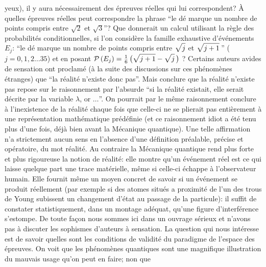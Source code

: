 yeux), il y aura n\'ecessairement des \'epreuves r\'eelles qui lui 
correspondent?  \`A  quelles \'epreuves r\'eelles peut correspondre la 
phrase ``le d\'e marque  un nombre de points compris entre $\sqrt{2}$  et 
$\sqrt{3}$''? Que  donnerait un calcul utilisant la r\`egle des 
probabilit\'es conditionnelles, si l'on consid\`ere la famille exhaustive 
d'\'ev\'enements $E_j$: ``le d\'e marque un nombre de points compris 
entre $\sqrt{\sdown{8.6} j}$ et $\sqrt{\sdown{8.6} j+1}\,$'' ($j=0,1,2 
\ldots  35$) et en posant ${\cal P}\, (E_j) = {1\over 
6}\,\big(\sqrt{\sdown{8.6} j+1} - \sqrt{\sdown{8.6} j}\,\big)$ ?  
\medskip 
Certains auteurs avides de sensation ont proclam\'e (\`a la suite des 
discussions sur ces ph\'enom\`enes \'etranges) que ``la r\'ealit\'e  
n'existe donc pas''. Mais conclure que la r\'ealit\'e n'existe pas repose  
sur le raisonnement par l'absurde ``si la r\'ealit\'e existait, elle serait  
d\'ecrite par la variable $\lambda$, or $\ldots$''. On pourrait par le 
m\^eme raisonnement  conclure \`a l'inexistence de la r\'ealit\'e   
chaque fois que celle-ci ne se plierait pas enti\`erement \`a une 
repr\'esentation math\'ematique pr\'ed\'efinie (et ce raisonnement  
idiot a \'et\'e tenu plus d'une fois, d\'ej\`a bien avant la M\'ecanique 
quantique). Une telle affirmation n'a strictement aucun sens en  
l'absence  d'une d\'efinition pr\'ealable, pr\'ecise et op\'eratoire, du mot  
r\'ealit\'e. Au contraire la M\'ecanique quantique 
rend plus forte et plus rigoureuse la notion de r\'ealit\'e: elle montre 
qu'un \'ev\'enement r\'eel  est ce qui laisse quelque part une trace 
mat\'erielle, m\^eme si celle-ci \'echappe \`a l'observateur humain. Elle  
fournit m\^eme un moyen concret de  savoir si un \'ev\'enement se  
produit r\'eellement (par exemple si des atomes situ\'es  a proximit\'e  
de l'un des trous de Young subissent un changement d'\'etat au passage  
de  la particule): il suffit de constater statistiquement, dans un montage 
ad\'equat,  qu'une figure d'interf\'erence s'estompe. De  toute  fa\c{c}on 
nous sommes ici dans un ouvrage s\'erieux et n'avons  pas \`a discuter 
les sophismes d'auteurs \`a sensation.  La question qui nous int\'eresse 
est de savoir quelles sont les conditions de validit\'e  du paradigme de 
l'espace des \'epreuves. On voit que les ph\'enom\`enes quantiques sont 
une magnifique illustration du mauvais usage qu'on peut en faire; non que 

